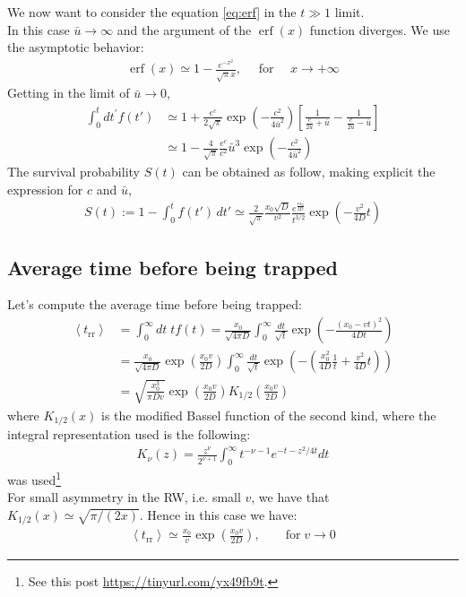 \documentclass[4apaper,11pt,fleqn]{article}
\theoremstyle{remark}
\theoremstyle{definition}
\begin{document}
We now want to consider the equation \eqref{eq:erf} in the $t \gg 1$ limit.\\
In this case $\bar{u}\rightarrow \infty$ and the argument of the $\operatorname{erf}(x)$ function diverges. We use the asymptotic behavior:
\begin{align*}
  \operatorname{erf}(x) \simeq 1-\frac{e^{-x^{2}}}{\sqrt{\pi} x}, \quad \text { for } \quad x \rightarrow+\infty
\end{align*}
Getting in the limit of $\bar{u} \rightarrow 0$,
\begin{align*}
 \int_{0}^{t} d t^{\prime} f(t') & \simeq 1+\frac{e^{c}}{2 \sqrt{\pi}} \exp \left(-\frac{c^{2}}{4 \bar{u}^{2}}\right)\left[\frac{1}{\frac{c}{2 \bar{u}}+\bar{u}}-\frac{1}{\frac{c}{2 \bar{u}}-\bar{u}}\right] \\ & \simeq 1-\frac{4}{\sqrt{\pi}} \frac{e^{c}}{c^{2}} \bar{u}^{3} \exp \left(-\frac{c^{2}}{4 \bar{u}^{2}}\right)
\end{align*}
The survival probability $S(t)$ can be obtained as follow, making explicit the expression for $c$ and $\bar{u}$,
\begin{align}
  S(t) := 1- \int_0^t f(t') \, dt' \simeq \frac{2}{\sqrt{\pi}} \frac{x_{0} \sqrt{D}}{v^{2}} \frac{e^{\frac{v x_{0}}{2 D}}}{t^{3 / 2}} \exp \left(-\frac{v^{2}}{4 D} t\right)
\end{align}

\subsection{Average time before being trapped}
Let's compute the average time before being trapped:
\begin{align*}
  \left\langle t_{\mathrm{rr}}\right\rangle &=\int_{0}^{\infty} dt\; t f(t)=\frac{x_{0}}{\sqrt{4 \pi D}} \int_{0}^{\infty} \frac{d t}{\sqrt{t}} \exp \left(-\frac{\left(x_{0}-v t\right)^{2}}{4 D t}\right) \\ &=\frac{x_{0}}{\sqrt{4 \pi D}} \exp \left(\frac{x_{0} v}{2 D}\right) \int_{0}^{\infty} \frac{d t}{\sqrt{t}} \exp \left(-\left(\frac{x_{0}^{2}}{4 D} \frac{1}{t}+\frac{v^{2}}{4 D} t\right)\right) \\ &=\sqrt{\frac{x_{0}^{3}}{\pi D v}} \exp \left(\frac{x_{0} v}{2 D}\right) K_{1 / 2}\left(\frac{x_{0} v}{2 D}\right)
\end{align*}
where $K_{1 / 2}(x)$ is the modified Bassel function of the second kind, where the integral representation used is the following:
\begin{align*}
  K_{\nu}(z)=\frac{z^{\nu}}{2^{\nu+1}} \int_{0}^{\infty} t^{-\nu-1} e^{-t-z^{2} / 4 t} d t
\end{align*}
was used\footnote{See this post \url{https://tinyurl.com/yx49fb9t}.}\\
For small asymmetry in the RW, i.e. small $v$, we have that $K_{1/2}(x) \simeq \sqrt{\pi/(2x)}$. Hence in this case we have:
\begin{align*}
  \left\langle t_{\mathrm{rr}}\right\rangle \simeq \frac{x_0}{v} \exp \left( \frac{x_0v}{2D} \right), \qquad \text{for} \; v \rightarrow 0
\end{align*}
\end{document}
